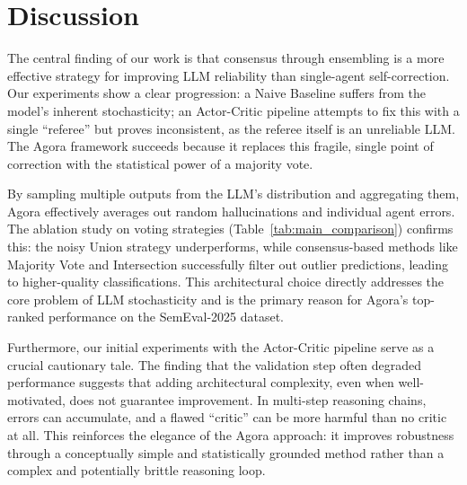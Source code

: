 \section{Discussion}


The central finding of our work is that consensus through ensembling is a more effective strategy for improving LLM reliability than single-agent self-correction. Our experiments show a clear progression: a Naive Baseline suffers from the model's inherent stochasticity; an Actor-Critic pipeline attempts to fix this with a single ``referee'' but proves inconsistent, as the referee itself is an unreliable LLM. The Agora framework succeeds because it replaces this fragile, single point of correction with the statistical power of a majority vote.

By sampling multiple outputs from the LLM's distribution and aggregating them, Agora effectively averages out random hallucinations and individual agent errors. The ablation study on voting strategies (Table~\ref{tab:main_comparison}) confirms this: the noisy Union strategy underperforms, while consensus-based methods like Majority Vote and Intersection successfully filter out outlier predictions, leading to higher-quality classifications. This architectural choice directly addresses the core problem of LLM stochasticity and is the primary reason for Agora's top-ranked performance on the SemEval-2025 dataset.


Furthermore, our initial experiments with the Actor-Critic pipeline serve as a crucial cautionary tale. 
The finding that the validation step often degraded performance suggests that adding architectural complexity, even when well-motivated, does not guarantee improvement. 
In multi-step reasoning chains, errors can accumulate, and a flawed ``critic'' can be more harmful than no critic at all. 
This reinforces the elegance of the Agora approach: it improves robustness through a conceptually simple and statistically grounded method rather than a complex and potentially brittle reasoning loop.